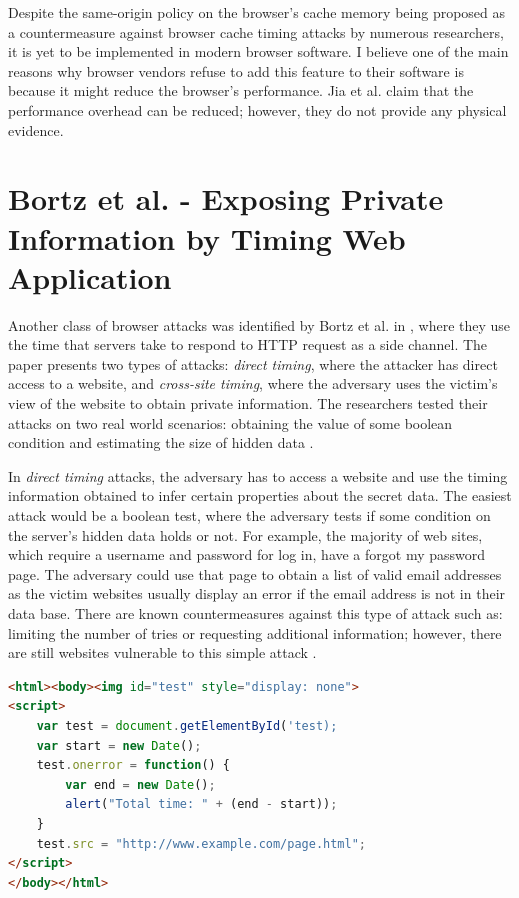 \documentclass[10pt,a4paper,twoside]{book}
\begin{document}
Despite the same-origin policy on the browser's cache memory being proposed as a countermeasure against browser cache timing attacks by numerous researchers, it is yet to be implemented in modern browser software. I believe one of the main reasons why browser vendors refuse to add this feature to their software is because it might reduce the browser's performance. Jia et al.\cite{jia2015know} claim that the performance overhead can be reduced; however, they do not provide any physical evidence.

\section{Bortz et al. - Exposing Private Information by Timing Web Application}
\label{bortz}
Another class of browser attacks was identified by Bortz et al. in \cite{bortz2007exposing}, where they use the time that servers take to respond to HTTP request as a side channel. The paper presents two types of attacks: \textit{direct timing}, where the attacker has direct access to a website, and \textit{cross-site timing}, where the adversary uses the victim's view of the website to obtain private information. The researchers tested their attacks on two real world scenarios: obtaining the value of some boolean condition and estimating the size of hidden data \cite{bortz2007exposing}.

In \textit{direct timing} attacks, the adversary has to access a website and use the timing information obtained to infer certain properties about the secret data. The easiest attack would be a boolean test, where the adversary tests if some condition on the server's hidden data holds or not. For example, the majority of web sites, which require a username and password for log in, have a forgot my password page. The adversary could use that page to obtain a list of valid email addresses as the victim websites usually display an error if the email address is not in their data base. There are known countermeasures against this type of attack such as: limiting the number of tries or requesting additional information; however, there are still websites vulnerable to this simple attack \cite{bortz2007exposing}. 

\begin{lstlisting}[caption={Example JavaScript timing code as shown in \cite{bortz2007exposing}},label={bortz}, language=HTML, showstringspaces=false]
<html><body><img id="test" style="display: none">
<script>
	var test = document.getElementById('test);
	var start = new Date();
	test.onerror = function() {
		var end = new Date();
		alert("Total time: " + (end - start));
	}
	test.src = "http://www.example.com/page.html";
</script>
</body></html>
\end{lstlisting}
\end{document}
